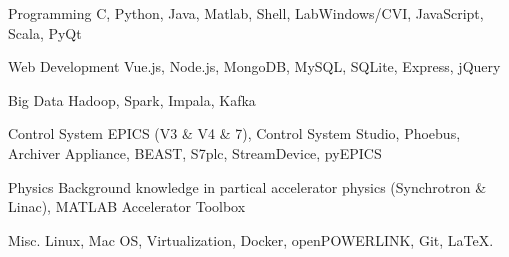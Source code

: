 

\begin{cvskills}

  \cvskill
    {Programming} %
    {C, Python, Java, Matlab, Shell, LabWindows/CVI, JavaScript, Scala, PyQt} %

  \cvskill
    {Web Development} %
    {Vue.js, Node.js, MongoDB, MySQL, SQLite, Express, jQuery} %

  \cvskill
	{Big Data} %
    {Hadoop, Spark, Impala, Kafka} %

  \cvskill
   {Control System} %
   {EPICS (V3 \& V4 \& 7), Control System Studio, Phoebus, Archiver Appliance, BEAST, S7plc, StreamDevice, pyEPICS} %

  \cvskill
    {Physics} %
    {Background knowledge in partical accelerator physics (Synchrotron \& Linac), MATLAB Accelerator Toolbox} %

  \cvskill
    {Misc.} %
    {Linux, Mac OS, Virtualization, Docker, openPOWERLINK, Git, \LaTeX.} %
  
\end{cvskills}
